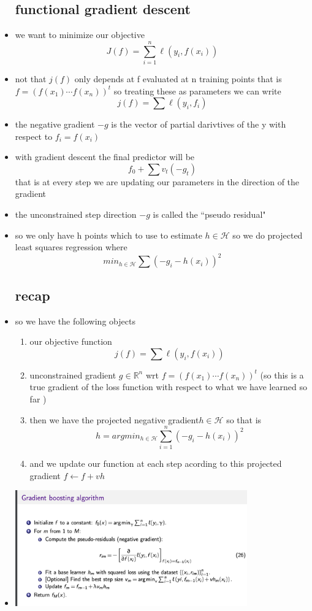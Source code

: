 \documentclass{article}
\begin{document}
\begin{itemize}
\subsection*{functional gradient descent}
\item we want to minimize our objective $$J(f)=\sum_{i=1}^{n}\ell(y_i,f(x_i))$$
\item not that $j(f)$ only depends at f evaluated at n training points that is $f=(f(x_1)\cdots f(x_n))^{t}$ so treating these as parameters we can write $$j(f)=\sum\ell(y_i,f_i)$$ 
\item the negative gradient $-g$ is the vector of partial darivtives of the y with respect to $f_i=f(x_i)$
\item with gradient descent the final predictor will be $$f_0+\sum v_t(-g_t)$$ that is at every step we are updating our parameters in the direction of the gradient 
\item the unconstrained step direction $-g$ is called the “pseudo residual"
\item so we only have h points which to use to estimate $h\in \mathcal{H}$ so we do projected least squares regression where $$min_{h\in \mathcal{H}}\sum(-g_i-h(x_i))^2$$ 
\subsection*{recap}
\item so we have the following objects 
\begin{enumerate}
    \item our objective function $$j(f)=\sum\ell(y_i,f(x_i))$$
    \item unconstrained gradient $g\in \mathbb{R}^{n}$ wrt $f=(f(x_1)\cdots f(x_n))^t$ (so this is a true gradient of the loss function with respect to what we have learned so far )
    \item then we have the projected negative gradient$h\in \mathcal{H}$ so that is $$h=argmin_{h\in \mathcal{H}}\sum_{i=1}^{n}(-g_i-h(x_i))^2$$
    \item and we update our function at each step acording to this projected gradient $f\leftarrow f + vh$
\end{enumerate}
\item \includegraphics*[width=10cm]{images/Screenshot 2023-05-14 at 11.17.34 PM.png}

\end{itemize}
\end{document}
